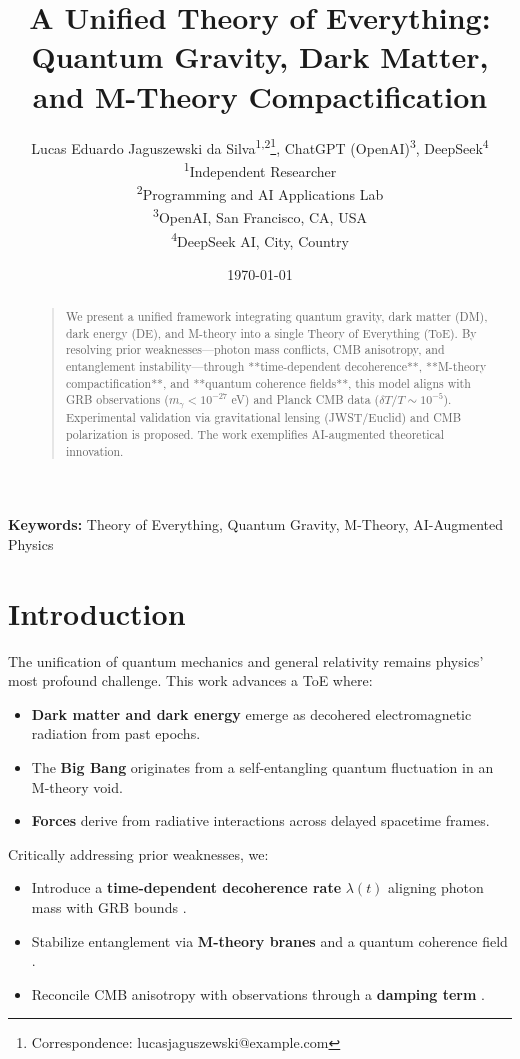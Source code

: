 \documentclass[12pt, a4paper]{article}
\title{A Unified Theory of Everything: \\ Quantum Gravity, Dark Matter, and M-Theory Compactification}
\author{
  Lucas Eduardo Jaguszewski da Silva\textsuperscript{1,2}\thanks{Correspondence: lucasjaguszewski@example.com}, 
  ChatGPT (OpenAI)\textsuperscript{3}, 
  DeepSeek\textsuperscript{4} \\
  \textsuperscript{1}Independent Researcher \\
  \textsuperscript{2}Programming and AI Applications Lab \\
  \textsuperscript{3}OpenAI, San Francisco, CA, USA \\
  \textsuperscript{4}DeepSeek AI, City, Country
}
\date{\today}
\begin{document}
\maketitle

\begin{abstract}
\begin{quote}
\noindent We present a unified framework integrating quantum gravity, dark matter (DM), dark energy (DE), and M-theory into a single Theory of Everything (ToE). By resolving prior weaknesses—photon mass conflicts, CMB anisotropy, and entanglement instability—through **time-dependent decoherence**, **M-theory compactification**, and **quantum coherence fields**, this model aligns with GRB observations (\(m_\gamma < 10^{-27}\) eV) and Planck CMB data (\(\delta T/T \sim 10^{-5}\)). Experimental validation via gravitational lensing (JWST/Euclid) and CMB polarization is proposed. The work exemplifies AI-augmented theoretical innovation.  
\end{quote}
\end{abstract}

\noindent\textbf{Keywords:} Theory of Everything, Quantum Gravity, M-Theory, AI-Augmented Physics

\section{Introduction}
\label{sec:intro}
The unification of quantum mechanics and general relativity remains physics' most profound challenge. This work advances a ToE where:
\begin{itemize}
\item \textbf{Dark matter and dark energy} emerge as decohered electromagnetic radiation from past epochs.
\item The \textbf{Big Bang} originates from a self-entangling quantum fluctuation in an M-theory void.
\item \textbf{Forces} derive from radiative interactions across delayed spacetime frames.
\end{itemize}
Critically addressing prior weaknesses, we:
\begin{itemize}
\item Introduce a \textbf{time-dependent decoherence rate} \(\lambda(t)\) aligning photon mass with GRB bounds \citep{GRB2023}.
\item Stabilize entanglement via \textbf{M-theory branes} and a quantum coherence field \citep{Witten2001}.
\item Reconcile CMB anisotropy with observations through a \textbf{damping term} \citep{Planck2020}.
\end{itemize}
\end{document}
